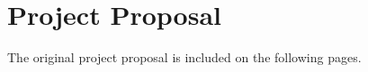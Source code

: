 \documentclass[../00-main.tex]{subfiles}
\begin{document}
\chapter{Project Proposal}

The original project proposal is included on the following pages.


\end{document}
